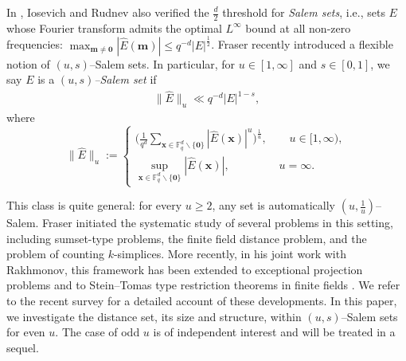 \documentclass[11pt]{article}
\newcommand{\Fq}{\mathbb{F}_q}
\newcommand{\Fqd}{\mathbb{F}_q^d}
\begin{document}
In \cite{IR07}, Iosevich and Rudnev also verified the $\frac{d}{2}$ threshold for \textit{Salem sets},  i.e.,  sets $E$ whose Fourier transform admits the optimal \(L^\infty\) bound at all non-zero frequencies: $\max_{\mathbf{m}\ne \mathbf{0}}|\widehat{E}(\mathbf{m})|\le q^{-d}|E|^{\frac{1}{2}}$. Fraser \cite{fraser2} recently introduced a flexible notion of $(u,s)$--Salem sets. In particular, for $u \in [1, \infty]$ and $s \in [0,1]$, we say $E$ is a \emph{$(u, s)$--Salem set} if 
	\begin{align}\label{Salem-set-inequality}
		\| \widehat{E} \|_u \ll q^{-d} |E|^{1-s},
	\end{align}
	where 
	\begin{equation}\label{def:norm-L^p}
		\| \widehat{E} \|_u:=
		\begin{cases}
			\bigg( \frac{1}{q^d} \sum\limits_{\mathbf{x} \in \mathbb{F}^d_q \backslash \{\mathbf{0}\}}  |\widehat{E}(\mathbf{x})|^u \bigg)^{\frac{1}{u}}, ~~~~~~~~~ u \in [1, \infty),\\
			\sup\limits_{\mathbf{x} \in \mathbb{F}^d_q \backslash \{\mathbf{0}\} } |\widehat{E}(\mathbf{x})|, ~~~~~~~~~~~~~~~~~~~~ u=\infty.
		\end{cases}
	\end{equation}


    This class is quite general: for every \(u\ge 2\), any set is automatically \((u,\frac{1}{u})\)--Salem. Fraser \cite{fraser2} initiated the systematic study of several problems in this setting, including sumset-type problems, the finite field distance problem, and the problem of counting $k$-simplices. More recently, in his joint work with Rakhmonov, this framework has been extended to exceptional projection problems and to Stein–Tomas type restriction theorems in finite fields \cite{fraser11, fraser22}. We refer to the recent survey \cite{fraser33} for a detailed account of these developments. In this paper, we investigate the distance set, its size and structure, within \((u,s)\)–Salem sets for even \(u\). The case of odd $u$ is of independent interest and will be treated in a sequel.


\end{document}
